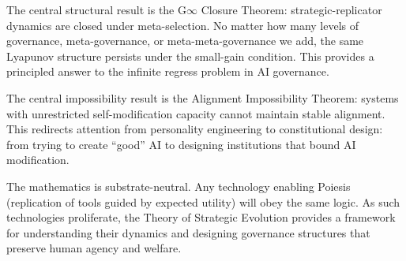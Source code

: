 \documentclass[12pt]{article}
\begin{document}
The central structural result is the G$\infty$ Closure Theorem: strategic-replicator dynamics are closed under meta-selection. No matter how many levels of governance, meta-governance, or meta-meta-governance we add, the same Lyapunov structure persists under the small-gain condition. This provides a principled answer to the infinite regress problem in AI governance.

The central impossibility result is the Alignment Impossibility Theorem: systems with unrestricted self-modification capacity cannot maintain stable alignment. This redirects attention from personality engineering to constitutional design: from trying to create ``good'' AI to designing institutions that bound AI modification.

The mathematics is substrate-neutral. Any technology enabling Poiesis (replication of tools guided by expected utility) will obey the same logic. As such technologies proliferate, the Theory of Strategic Evolution provides a framework for understanding their dynamics and designing governance structures that preserve human agency and welfare.

\end{document}
